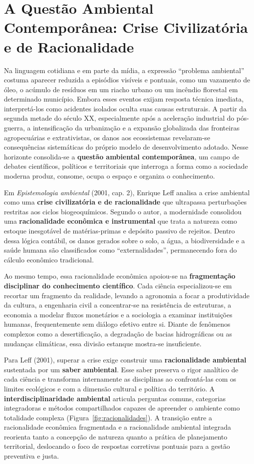 \section{A Questão Ambiental Contemporânea: Crise Civilizatória e de Racionalidade}

Na linguagem cotidiana e em parte da mídia, a expressão ``problema ambiental'' costuma aparecer reduzida a episódios visíveis e pontuais, como um vazamento de óleo, o acúmulo de resíduos em um riacho urbano ou um incêndio florestal em determinado município. Embora esses eventos exijam resposta técnica imediata, interpretá-los como acidentes isolados oculta suas causas estruturais. A partir da segunda metade do século XX, especialmente após a aceleração industrial do pós-guerra, a intensificação da urbanização e a expansão globalizada das fronteiras agropecuárias e extrativistas, os danos aos ecossistemas revelaram-se consequências sistemáticas do próprio modelo de desenvolvimento adotado. Nesse horizonte consolida-se a \textbf{questão ambiental contemporânea}, um campo de debates científicos, políticos e territoriais que interroga a forma como a sociedade moderna produz, consome, ocupa o espaço e organiza o conhecimento.

Em \emph{Epistemologia ambiental} (2001, cap. 2), Enrique Leff analisa a crise ambiental como uma \textbf{crise civilizatória e de racionalidade} que ultrapassa perturbações restritas aos ciclos biogeoquímicos. Segundo o autor, a modernidade consolidou uma \textbf{racionalidade econômica e instrumental} que trata a natureza como estoque inesgotável de matérias-primas e depósito passivo de rejeitos. Dentro dessa lógica contábil, os danos gerados sobre o solo, a água, a biodiversidade e a saúde humana são classificados como ``externalidades'', permanecendo fora do cálculo econômico tradicional.

Ao mesmo tempo, essa racionalidade econômica apoiou-se na \textbf{fragmentação disciplinar do conhecimento científico}. Cada ciência especializou-se em recortar um fragmento da realidade, levando a agronomia a focar a produtividade da cultura, a engenharia civil a concentrar-se na resistência de estruturas, a economia a modelar fluxos monetários e a sociologia a examinar instituições humanas, frequentemente sem diálogo efetivo entre si. Diante de fenômenos complexos como a desertificação, a degradação de bacias hidrográficas ou as mudanças climáticas, essa divisão estanque mostra-se insuficiente.

Para Leff (2001), superar a crise exige construir uma \textbf{racionalidade ambiental} sustentada por um \textbf{saber ambiental}. Esse saber preserva o rigor analítico de cada ciência e transforma internamente as disciplinas ao confrontá-las com os limites ecológicos e com a dimensão cultural e política do território. A \textbf{interdisciplinaridade ambiental} articula perguntas comuns, categorias integradoras e métodos compartilhados capazes de apreender o ambiente como totalidade complexa (Figura~\ref{fig:racionalidades}). A transição entre a racionalidade econômica fragmentada e a racionalidade ambiental integrada reorienta tanto a concepção de natureza quanto a prática de planejamento territorial, deslocando o foco de respostas corretivas pontuais para a gestão preventiva e justa.

